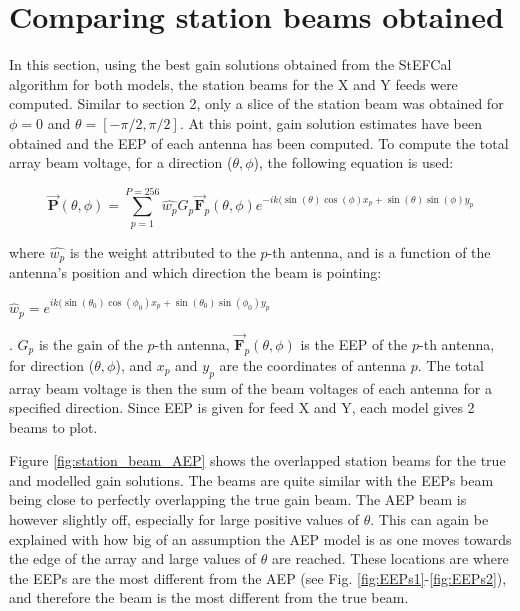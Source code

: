 \documentclass[12pt]{report} %
\begin{document}
\section{Comparing station beams obtained}

In this section, using the best gain solutions obtained from the StEFCal algorithm for both models, the station beams for the X and Y feeds were computed. Similar to section 2, only a slice of the station beam was obtained for $\phi = 0$ and $\theta = [-\pi/2, \pi/2]$. At this point, gain solution estimates have been obtained and the EEP of each antenna has been computed. To compute the total array beam voltage, for a direction ($\theta, \phi$), the following equation is used:

\begin{equation}
    \vec{\mathbf{P}}(\theta, \phi) = \sum_{p = 1}^{P = 256} \hat{w_{p}} G_{p} \vec{\mathbf{F}}_{p}(\theta, \phi) e^{-ik(\sin(\theta)\cos(\phi)x_{p} + \sin(\theta)\sin(\phi)y_{p}}
\end{equation}

where $\hat{w_{p}}$ is the weight attributed to the $p$-th antenna, and is a function of the antenna's position and which direction the beam is pointing:

\begin{centering}
  $\hat{w}_{p} = e^{ik(\sin(\theta_{0})\cos(\phi_{0})x_{p} + \sin(\theta_{0})\sin(\phi_{0})y_{p}}$
\end{centering}.
$G_{p}$ is the gain of the $p$-th antenna, $\vec{\mathbf{F}}_{p}(\theta, \phi)$ is the EEP of the $p$-th antenna, for direction ($\theta, \phi$), and $x_{p}$ and $y_{p}$ are the coordinates of antenna $p$. The total array beam voltage is then the sum of the beam voltages of each antenna for a specified direction. Since EEP is given for feed X and Y, each model gives 2 beams to plot.



Figure \ref{fig:station_beam_AEP} shows the overlapped station beams for the true and modelled gain solutions. The beams are quite similar with the EEPs beam being close to perfectly overlapping the true gain beam. The AEP beam is however slightly off, especially for large positive values of $\theta$. This can again be explained with how big of an assumption the AEP model is as one moves towards the edge of the array and large values of $\theta$ are reached. These locations are where the EEPs are the most different from the AEP (see Fig. \ref{fig:EEPs1}-\ref{fig:EEPs2}), and therefore the beam is the most different from the true beam.
\end{document}
